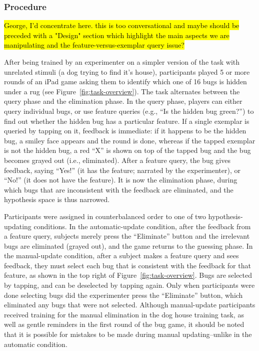 \documentclass[10pt,letterpaper]{article}
\begin{document}
\subsubsection{Procedure}

\hl{George, I'd concentrate here.  this is too conversational and maybe
should be preceded with a "Design" section which highlight the main
aspects we are manipulating and the feature-versus-exemplar query issue?}

After being trained by an experimenter on a simpler version of the task with 
unrelated stimuli (a dog trying to find it's house), participants played 5 or more 
rounds of an iPad game asking them to identify which one of 16 bugs is hidden 
under a rug (see Figure~\ref{fig:task-overview}). The task alternates between the 
query phase and the elimination phase. In the query phase, players can either query 
individual bugs, or use feature queries (e.g., ``Is the hidden bug green?'') to find out 
whether the hidden bug has a particular feature. If a single exemplar is queried by 
tapping on it, feedback is immediate: if it happens to be the hidden bug, a smiley 
face appears and the round is done, whereas if the tapped exemplar is not the 
hidden bug, a red ``X'' is shown on top of the tapped bug and the bug becomes 
grayed out (i.e., eliminated). After a feature query, the bug gives feedback, saying 
``Yes!'' (it has the feature; narrated by the experimenter), or ``No!'' (it does not have 
the feature). It is now the elimination phase, during which bugs that are inconsistent 
with the feedback are eliminated, and the hypothesis space is thus narrowed. 

Participants were assigned in counterbalanced order to one of two hypothesis-
updating conditions. In the automatic-update condition, after the feedback from a 
feature query, subjects merely press the ``Eliminate'' button and the irrelevant bugs 
are eliminated (grayed out), and the game returns to the guessing phase. In the 
manual-update condition, after a subject makes a feature query and sees feedback, 
they must select each bug that is consistent with the feedback for that feature, as 
shown in the top right of Figure~\ref{fig:task-overview}. Bugs are selected by 
tapping, and can be deselected by tapping again. Only when participants were done 
selecting bugs did the experimenter press the ``Eliminate'' button, which eliminated 
any bugs that were not selected. Although manual-update participants received 
training for the manual elimination in the dog house training task, as well as gentle 
reminders in the first round of the bug game, it should be noted that it is possible for 
mistakes to be made during manual updating--unlike in the automatic condition.
\end{document}
